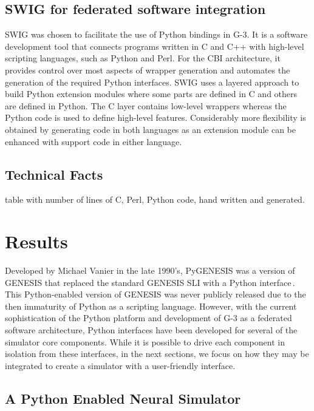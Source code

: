 \documentclass[12pt]{article}
\begin{document}
\subsection{SWIG for federated software integration}

SWIG was chosen to facilitate the use of Python bindings in G-3. It is
a software development tool that connects programs written in C and
C++ with high-level scripting languages, such as Python and Perl. For
the CBI architecture, it provides control over most aspects of wrapper
generation and automates the generation of the required Python
interfaces. SWIG uses a layered approach to build Python extension
modules where some parts are defined in C and
others are defined in Python. The C layer contains low-level wrappers
whereas the Python code is used to define high-level features.
Considerably more flexibility is obtained by generating code in both
languages as an extension module can be enhanced with support code in
either language.

\subsection{Technical Facts}

table with number of lines of C, Perl, Python code, hand written and
generated.

\section{Results}

Developed by Michael Vanier in the late 1990's, PyGENESIS was a
version of GENESIS that replaced the standard GENESIS SLI with a
Python interface\,\cite{vanier97:_genes_python}.  This Python-enabled
version of GENESIS was never publicly released due to the then
immaturity of Python as a scripting language.  However, with the
current sophistication of the Python platform and development of G-3
as a federated software architecture, Python interfaces have been
developed for several of the simulator core components.  While it is
possible to drive each component in isolation from these interfaces,
in the next sections, we focus on how they may be integrated to create
a simulator with a user-friendly interface.

\subsection{A Python Enabled Neural Simulator}
\end{document}
